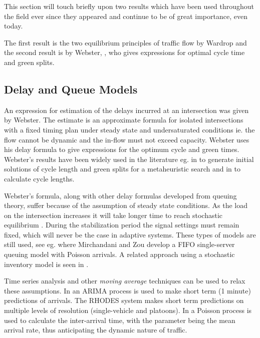 \label{sec:history}

This section will touch briefly upon two results which have been used
throughout the field ever since they appeared and continue to be of
great importance, even today.

The first result is the two equilibrium principles of traffic flow by
Wardrop \cite{Wardrop} and the second result is by Webster,
\cite{Webster}, who gives expressions for optimal cycle time and green
splits.

\subsection{Delay and Queue Models}
\label{sec:webster}

An expression for estimation of the delays incurred at an intersection
was given by Webster. The estimate is an approximate formula for
isolated intersections with a fixed timing plan under steady state and
undersaturated conditions ie. the flow cannot be dynamic and the
in-flow must not exceed capacity.  Webster uses his delay formula to
give expressions for the optimum cycle and green times.  Webster's
results have been widely used in the literature eg. in \cite{1} to
generate initial solutions of cycle length and green splits for a
metaheuristic search and in \cite{30} to calculate cycle lengths.

Webster's formula, along with other delay formulas developed from
queuing theory, suffer because of the assumption of steady state
conditions. As the load on the intersection increases it will take
longer time to reach stochastic equilibrium
\cite{traffictheory}. During the stabilization period the signal
settings must remain fixed, which will never be the case in adaptive
systems. These types of models are still used, see eg. \cite{38} where
Mirchandani and Zou develop a FIFO single-server queuing model with
Poisson arrivals. A related approach using a stochastic inventory
model is seen in \cite{10}.

Time series analysis and other \textit{moving average} techniques can
be used to relax these assumptions. In \cite{shortpredict} an ARIMA
process is used to make short term (1 minute) predictions of
arrivals. The RHODES system \cite{44} makes short term predictions on
multiple levels of resolution (single-vehicle and platoons). In
\cite{1} a Poisson process is used to calculate the inter-arrival time,
with the parameter being the mean arrival rate, thus anticipating the
dynamic nature of traffic.

